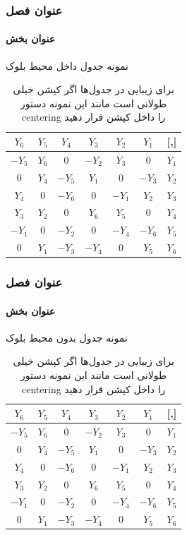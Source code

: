 \documentclass{beamer}
\begin{document}
\begin{frame}
\frametitle{عنوان فصل }
\framesubtitle{عنوان بخش}
\begin{block}{نمونه جدول داخل محیط بلوک}
\justifying	
\begin{table}[!h]
\centering
\begin{tabular}{|cccccc|c|}
\hline
$ Y_{6} $ & $ Y_{5} $ & $ Y_{4} $ & $ Y_{3} $ & $ Y_{2} $ & $ Y_{1} $ &   [,]  \\
\hline
$ -Y_{5} $ & $ Y_{6} $ &  0 & $ -Y_{2} $ & $ Y_{3} $  & 0 & $ Y_{1} $ \\
0 & $ Y_{4} $ & $ -Y_{5} $ & $ Y_{1} $  & 0 & $ -Y_{3} $ & $ Y_{2} $ \\
$ Y_{4} $ &  0 & $ -Y_{6} $  & 0 & $ -Y_{1} $ & $ Y_{2} $ & $ Y_{3} $  \\
$ Y_{3} $ & $ Y_{2} $  & 0 & $ Y_{6} $ & $ Y_{5} $ & 0 & $ Y_{4} $  \\
$ -Y_{1} $  & 0 & $ -Y_{2} $  & 0 & $ -Y_{4} $ & $ -Y_{6} $ & $ Y_{5} $  \\
0 & $ Y_{1} $ & $ -Y_{3} $ & $ -Y_{4} $  & 0 & $ Y_{5} $ &  $ Y_{6} $  \\
\hline
\end{tabular} 
\caption{\centering
برای زیبایی در  جدول‌ها اگر کپشن خیلی طولانی است مانند این نمونه دستور centering را داخل کپشن قرار دهید
}
\label{tab:my-table-1}
\end{table}
\end{block}	
\end{frame}


\begin{frame}
\frametitle{عنوان فصل }
\framesubtitle{عنوان بخش}
\justifying	
نمونه جدول بدون محیط بلوک
\begin{table}[!h]
\centering
\begin{tabular}{|cccccc|c|}
\hline
$ Y_{6} $ & $ Y_{5} $ & $ Y_{4} $ & $ Y_{3} $ & $ Y_{2} $ & $ Y_{1} $ &   [,]  \\
\hline
$ -Y_{5} $ & $ Y_{6} $ &  0 & $ -Y_{2} $ & $ Y_{3} $  & 0 & $ Y_{1} $ \\
0 & $ Y_{4} $ & $ -Y_{5} $ & $ Y_{1} $  & 0 & $ -Y_{3} $ & $ Y_{2} $ \\
$ Y_{4} $ &  0 & $ -Y_{6} $  & 0 & $ -Y_{1} $ & $ Y_{2} $ & $ Y_{3} $  \\
$ Y_{3} $ & $ Y_{2} $  & 0 & $ Y_{6} $ & $ Y_{5} $ & 0 & $ Y_{4} $  \\
$ -Y_{1} $  & 0 & $ -Y_{2} $  & 0 & $ -Y_{4} $ & $ -Y_{6} $ & $ Y_{5} $  \\
0 & $ Y_{1} $ & $ -Y_{3} $ & $ -Y_{4} $  & 0 & $ Y_{5} $ &  $ Y_{6} $  \\
\hline
\end{tabular} 
\caption{\centering
برای زیبایی در  جدول‌ها اگر کپشن خیلی طولانی است مانند این نمونه دستور centering را داخل کپشن قرار دهید
}
\label{tab:my-table-2}
\end{table}
\end{frame}
\end{document}
